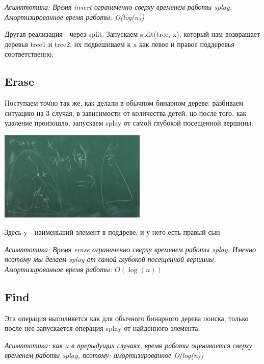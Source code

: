 \textit{Асимптотика: Время insert ограниченно сверху временем работы splay. Амортизированное время работы: O(log(n))}

Другая реализация - через split. Запускаем split(tree, x), который нам возвращает деревья tree1 и tree2, их подвешиваем к x как левое и правое поддеревья соответственно.


\subsection*{Erase }

Поступаем точно так же, как делали в обычном бинарном дереве: разбиваем ситуацию на 3 случая, в зависимости от количества детей, но после того, как удаление произошло, запускаем splay от самой глубокой посещенной вершины.

\includegraphics[width = 7cm]{images/47-50_erase}

Здесь y - наименьший элемент в поддреве, и у него есть правый сын

\textit{Асимптотика: Время erase ограниченно сверху временем работы splay. Именно поэтому мы делаем splay от самой глубокой посещенной вершины. Амортизированное время работы: $O(\log(n))$}

\subsection*{Find }

Эта операция выполняется как для обычного бинарного дерева поиска, только после нее запускается операция splay от найденного элемента.

\textit{Асимптотика: как и в прерыдущих случаях, время работы оценивается сверху временем работы splay, поэтому: амортизированное O(log(n))}